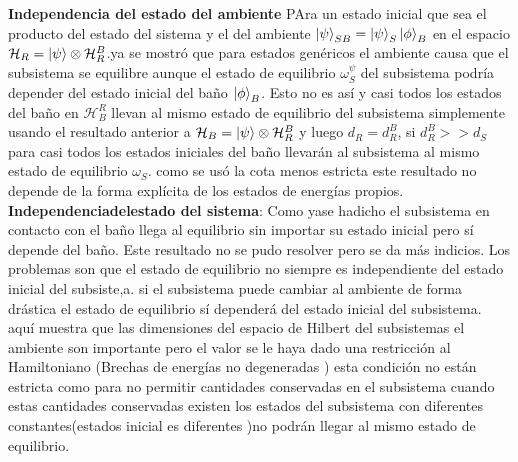 \textbf{Independencia del estado del ambiente}
PAra un estado inicial que sea el producto del estado del sistema y el del ambiente $\ket{\psi}_{SB}= \ket{\psi}_{S} \ket{\phi}_{B}$ en el espacio $\mathcal{H}_{R}=\ket{\psi} \otimes \mathcal{H}_{R}^{B}$.ya se mostró que para estados genéricos el ambiente causa que el subsistema se equilibre aunque el estado de equilibrio $\omega_{S}^{\psi}$ del subsistema podría  depender del estado inicial del baño $\ket{\phi}_{B}$. Esto no es así y casi todos los estados del baño en $\mathcal{H}_{B}^{R}$ llevan al mismo estado de equilibrio del subsistema simplemente usando el resultado anterior a  $\mathcal{H}_{B} = \ket{\psi}\otimes \mathcal{H}_{R}^{B}$ y luego $d_{R} = d_{R}^{B}$, si $d_{R}^{B}>>d_{S}$ para casi todos los estados iniciales del baño llevarán al subsistema al mismo estado de equilibrio $\omega_{S}$. como se usó la cota menos estricta este resultado no depende de la forma explícita de los estados de energías propios.
\textbf{Independenciadelestado del sistema}: Como yase hadicho el subsistema en contacto con el baño llega al equilibrio sin importar su estado inicial pero sí depende del baño. Este resultado no se pudo resolver pero se da más indicios.
Los problemas son que el estado de equilibrio no siempre es independiente del estado inicial del subsiste,a. si el subsistema puede cambiar al ambiente de forma drástica el estado de equilibrio sí dependerá del estado inicial del subsistema. aquí muestra que las dimensiones del espacio de Hilbert del subsistemas el ambiente son importante pero el valor se le haya dado una restricción al Hamiltoniano (Brechas de energías no degeneradas ) esta condición no están estricta como para no permitir cantidades conservadas en el subsistema cuando estas cantidades conservadas existen los estados del subsistema con diferentes constantes(estados inicial es diferentes )no podrán llegar al mismo estado de equilibrio.


